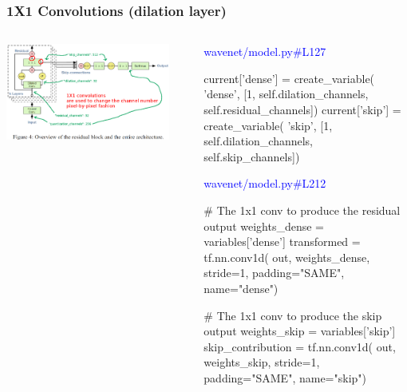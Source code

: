 \documentclass[8pt]{beamer}
\begin{document}
\begin{frame}[fragile]
\frametitle{1X1 Convolutions (dilation layer)}
\begin{columns}
\begin{column}{0.5\textwidth}
 
\includegraphics[width=0.9\textwidth]{./dl3_images/1x1_convolutions_2.png}

\end{column}
\begin{column}{0.5\textwidth}
 
\textcolor{blue}{wavenet/model.py\#L127}
 
\begin{verbnobox}[\tiny]
    current['dense'] = create_variable(
        'dense',
        [1,
            self.dilation_channels,
            self.residual_channels])
    current['skip'] = create_variable(
        'skip',
        [1,
            self.dilation_channels,
            self.skip_channels])
\end{verbnobox}

\textcolor{blue}{wavenet/model.py\#L212}
 
 \begin{verbnobox}[\tiny]
    # The 1x1 conv to produce the residual output
    weights_dense = variables['dense']
    transformed = tf.nn.conv1d(
        out, weights_dense, stride=1, padding="SAME", name="dense")

    # The 1x1 conv to produce the skip output
    weights_skip = variables['skip']
    skip_contribution = tf.nn.conv1d(
        out, weights_skip, stride=1, padding="SAME", name="skip")
\end{verbnobox}

\end{column}
\end{columns} 
 
\end{frame}
\end{document}
